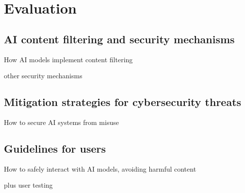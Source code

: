 \chapter{Evaluation \label{cha:eva}}

\section{AI content filtering and security mechanisms}
How AI models implement content filtering

other security mechanisms

\section{Mitigation strategies for cybersecurity threats}
How to secure AI systems from misuse

\section{Guidelines for users}
How to safely interact with AI models, avoiding harmful content

plus user testing